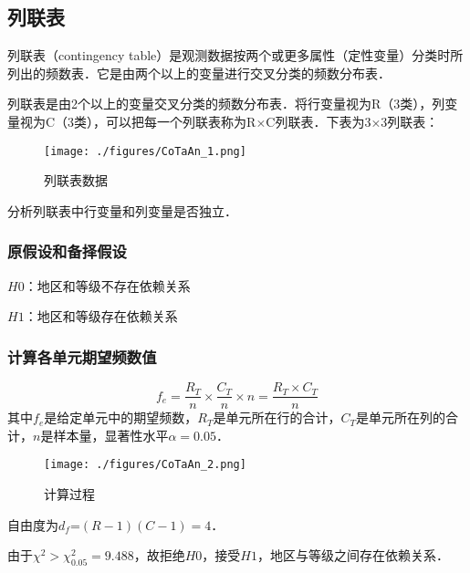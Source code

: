 \subsection{列联表}
列联表（contingency table）是观测数据按两个或更多属性（定性变量）分类时所列出的频数表．它是由两个以上的变量进行交叉分类的频数分布表．
\begin{example}{}
列联表是由2个以上的变量交叉分类的频数分布表．将行变量视为R（3类），列变量视为C（3类），可以把每一个列联表称为R×C列联表．下表为3×3列联表：
\begin{figure}[ht]
\centering
\texttt{[image: ./figures/CoTaAn\_1.png]}
\caption{列联表数据} \label{CoTaAn_fig1}
\end{figure}
分析列联表中行变量和列变量是否独立．

\subsubsection{原假设和备择假设}
$H0$：地区和等级不存在依赖关系

$H1$：地区和等级存在依赖关系
\subsubsection{计算各单元期望频数值}
\begin{equation}
f_e=\frac {R_T}{n}\times \frac {C_T}{n}\times n =\frac{R_T \times C_T}{n}
\end{equation}
其中$f_e$是给定单元中的期望频数，$R_T$是单元所在行的合计，$C_T$是单元所在列的合计，$n$是样本量，显著性水平$\alpha=0.05$．
\begin{figure}[ht]
\centering
\texttt{[image: ./figures/CoTaAn\_2.png]}
\caption{计算过程} \label{CoTaAn_fig2}
\end{figure}
自由度为$d_f$=$(R-1)(C-1)=4$．

由于$\chi^2>\chi^2_{0.05}=9.488$，故拒绝$H0$，接受$H1$，地区与等级之间存在依赖关系．
\end{example}